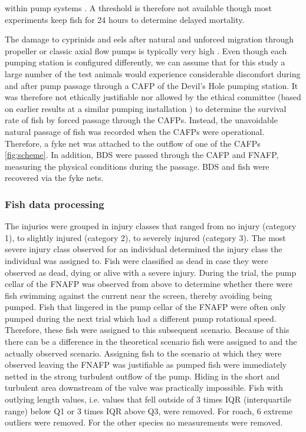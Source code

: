 \documentclass[fleqn,10pt]{wlscirep}
\begin{document}
within pump systems \cite{Bierschenk2019FishPumps}. A threshold is therefore not available though most experiments keep fish for 24 hours to determine delayed mortality.  

The damage to cyprinids and eels after natural and unforced migration through propeller or classic axial flow pumps is typically very high \cite{Buysse2014MortalityStations}. Even though each pumping station is configured differently, we can assume that for this study a large number of the test animals would experience considerable discomfort during and after pump passage through a CAFP of the Devil’s Hole pumping station. It was therefore not ethically justifiable nor allowed by the ethical committee (based on earlier results at a similar pumping installation \cite{Buysse2014MortalityStations}) to determine the survival rate of fish by forced passage through the CAFPs. Instead, the unavoidable natural passage of fish was recorded when the CAFPs were operational. Therefore, a fyke net was  attached to the outflow of one of the CAFPs \ref{fig:scheme}. In addition, BDS were passed through the CAFP and FNAFP, measuring the physical conditions during the passage. BDS and fish were recovered via the fyke nets.

\subsubsection*{Fish data processing}
The injuries were grouped in injury classes that ranged from no injury (category 1), to slightly injured (category 2), to severely injured (category 3). The most severe injury class observed for an individual determined the injury class the individual was assigned to. Fish were classified as dead in case they were observed as dead, dying or alive with a severe injury. During the trial, the pump cellar of the FNAFP was observed from above to determine whether there were fish swimming against the current near the screen, thereby avoiding being pumped. Fish that lingered in the pump cellar of the FNAFP were often only pumped during the next trial which had a different pump rotational speed. Therefore, these fish were assigned to this subsequent scenario. Because of this there can be a difference in the theoretical scenario fish were assigned to and the actually observed scenario. Assigning fish to the scenario at which they were observed leaving the FNAFP  was justifiable as pumped fish were immediately netted in the strong turbulent outflow of the pump. Hiding in the short and turbulent area downstream of the valve was practically impossible. Fish with outlying length values, i.e. values that fell outside of 3 times IQR (interquartile range) below Q1 or 3 times IQR above Q3, were removed. For roach, 6 extreme outliers were removed. For the other species no measurements were removed.
\end{document}
